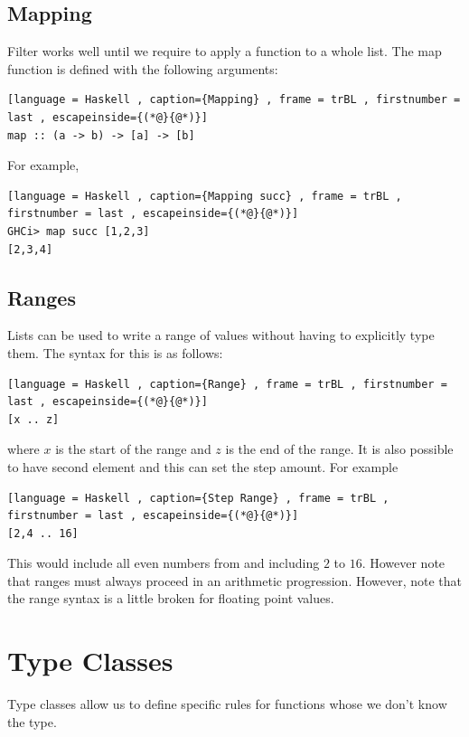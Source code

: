 \documentclass[a4paper]{article}
\theoremstyle{plain}
\theoremstyle{definition}
\theoremstyle{remark}
\begin{document}
\subsection{Mapping}
Filter works well until we require to apply a function to a whole list. The map function is defined with the following arguments:
\begin{lstlisting}[language = Haskell , caption={Mapping} , frame = trBL , firstnumber = last , escapeinside={(*@}{@*)}]
map :: (a -> b) -> [a] -> [b]
\end{lstlisting}
For example,
\begin{lstlisting}[language = Haskell , caption={Mapping succ} , frame = trBL , firstnumber = last , escapeinside={(*@}{@*)}]
GHCi> map succ [1,2,3]
[2,3,4]
\end{lstlisting}
\subsection{Ranges}
Lists can be used to write a range of values without having to explicitly type them. The syntax for this is as follows:
\begin{lstlisting}[language = Haskell , caption={Range} , frame = trBL , firstnumber = last , escapeinside={(*@}{@*)}]
[x .. z]
\end{lstlisting}
where $x$ is the start of the range and $z$ is the end of the range. It is also possible to have second element and this can set the step amount. For example
\begin{lstlisting}[language = Haskell , caption={Step Range} , frame = trBL , firstnumber = last , escapeinside={(*@}{@*)}]
[2,4 .. 16]
\end{lstlisting}
This would include all even numbers from and including $2$ to $16$. However note that ranges must always proceed in an arithmetic progression. However, note that the range syntax is a little broken for floating point values.
\section{Type Classes}
Type classes allow us to define specific rules for functions whose we don't know the type.
\end{document}
